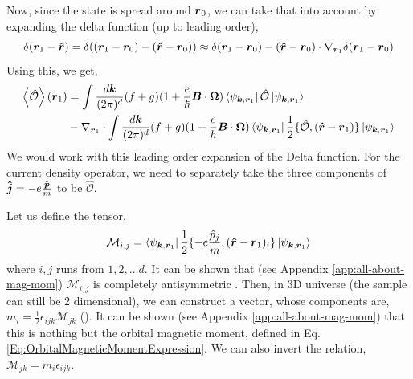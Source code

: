 \documentclass{report}
\renewcommand\vec[1]{\ensuremath\boldsymbol{#1}} %
\begin{document}
Now, since the state is spread around $\vec{r}_0$, we can take that into account by expanding the delta function (up to leading order),
$$
\delta(\vec{r}_1 - \vec{\hat{r}}) = \delta((\vec{r}_1 - \vec{r}_0) - (\vec{\hat{r}} - \vec{r}_0)) \approx \delta(\vec{r}_1 - \vec{r}_0) - (\vec{\hat{r}} - \vec{r}_0) \cdot \nabla_{\vec{r}_1} \delta(\vec{r}_1 - \vec{r}_0)
$$
Using this, we get,
\begin{equation}\label{Eq:expectation-value-of-general-operator-O}
	\begin{aligned}
	\expval{\hat{\mathcal{O}}}(\vec{r}_1) &= \int  \frac{d\vec{k}}{(2\pi)^d} (f+g) (1+\frac{e}{\hbar} \vec{B}\cdot\vec{\Omega})
	\bra{\psi_{\vec{k},\vec{r}_1}} \hat{\mathcal{O}} \ket{\psi_{\vec{k},\vec{r}_1}} \\
	& -\nabla_{\vec{r}_1} \cdot \int \frac{d\vec{k}}{(2\pi)^d} (f+g) (1+\frac{e}{\hbar} \vec{B}\cdot\vec{\Omega})
	\bra{\psi_{\vec{k},\vec{r}_1}} \frac{1}{2}\{\hat{\mathcal{O}}, (\vec{\hat{r}} - \vec{r}_1)\} \ket{\psi_{\vec{k},\vec{r}_1}} 
	\end{aligned} 
\end{equation}
We would work with this leading order expansion of the Delta function. For the current density operator, we need to separately take the three components of $\vec{\hat{j}} = -e\frac{\hat{\vec{p}}}{m}$ to be $\hat{\mathcal{O}}$.

Let us define the tensor,
$$\mathcal{M}_{i,j} = \bra{\psi_{\vec{k},\vec{r}_1}} \frac{1}{2}\{-e\frac{\hat{p}_j}{m}, (\vec{\hat{r}} - \vec{r}_1)_i\} \ket{\psi_{\vec{k},\vec{r}_1}} 
$$
where $i,j$ runs from $1,2, \dots d$. It can be shown that (see Appendix \ref{app:all-about-mag-mom}) $\mathcal{M}_{i,j}$ is completely antisymmetric \cite{PhysRevLett.124.066601}. Then, in 3D universe (the sample can still be 2 dimensional), we can construct a vector, whose components are, $m_i = \frac{1}{2} \epsilon_{ijk} \mathcal{M}_{j k}$ (\cite{PhysRevLett.124.066601}). It can be shown (see Appendix \ref{app:all-about-mag-mom}) that this is nothing but the orbital magnetic moment, defined in Eq. \eqref{Eq:OrbitalMagneticMomentExpression}. We can also invert the relation, $\mathcal{M}_{jk} = m_i \epsilon_{ijk}$.
\end{document}
